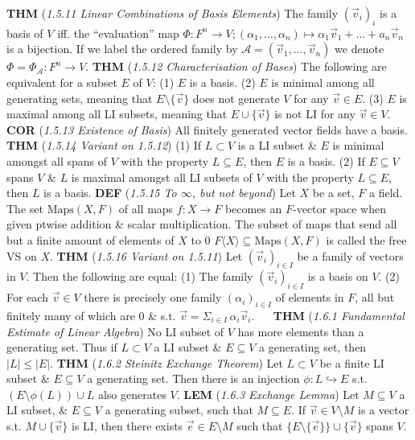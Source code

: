 \documentclass{article}
\newcommand{\wde}[1]{\textcolor{defc}{\textbf{DEF}} (\textcolor{namec}{\textit{#1}})}
\newcommand{\wl}[1]{\textcolor{lemc}{\textbf{LEM}} (\textcolor{namec}{\textit{#1}})}
\newcommand{\wc}[1]{\textcolor{corc}{\textbf{COR}} (\textcolor{namec}{\textit{#1}})}
\newcommand{\wt}[1]{\textcolor{thmc}{\textbf{THM}} (\textcolor{namec}{\textit{#1}})}
\newcommand{\Maps}[0]{\text{Maps}}
\begin{document}
\begin{multicols}{2}
  \wt{1.5.11 Linear Combinations of Basis Elements} The family $(\vec{v}_{i})_{i}$ is a basis of $V$ iff. the ``evaluation'' map $\Phi : F^{n} \to V; (\alpha_{1}, \dots, \alpha_{n}) \mapsto \alpha_{1}\vec{v}_{1} + \dots + a_{n}\vec{v}_{n}$ is a bijection. If we label the ordered family by $\mathcal{A} = (\vec{v}_{1}, \dots, \vec{v}_{n})$ we denote $\Phi = \Phi_{\mathcal{A}} : F^{n} \to V$.
  \wt{1.5.12 Characterisation of Bases} The following are equivalent for a subset $E$ of $V$:
  (1) $E$ is a basis.
  (2) $E$ is minimal among all generating sets, meaning that $E \setminus \{\vec{v}\}$ does not generate $V$ for any $\vec{v} \in E$.
  (3) $E$ is maximal among all LI subsets, meaning that $E \cup \{\vec{v}\}$ is not LI for any $\vec{v} \in V$.
  \wc{1.5.13 Existence of Basis} All finitely generated vector fields have a basis.
  \wt{1.5.14 Variant on 1.5.12}
  (1) If $L \subset V$ is a LI subset \& $E$ is minimal amongst all spans of $V$ with the property $L \subseteq E$, then $E$ is a basis.
  (2) If $E \subseteq V$ spans $V$ \& $L$ is maximal amongst all LI subsets of $V$ with the property $L \subseteq E$, then $L$ is a basis.
  \wde{1.5.15 To $\infty$, but not beyond} Let $X$ be a set, $F$ a field. The set $\Maps(X,F)$ of all maps $f : X \to F$ becomes an $F$-vector space when given ptwise addition \& scalar multiplication. The subset of maps that send all but a finite amount of elements of $X$ to 0 $F \langle X \rangle \subseteq \Maps(X, F)$ is called the free VS on $X$.
  \wt{1.5.16 Variant on 1.5.11} Let $(\vec{v}_{i})_{i \in I}$ be a family of vectors in $V$. Then the following are equal:
  (1) The family $(\vec{v}_{i})_{i \in I}$ is a basis on $V$.
  (2) For each $\vec{v} \in V$ there is precisely one family $(\alpha_{i})_{i \in I}$ of elements in $F$, all but finitely many of which are 0 \& s.t. $\vec{v} = \Sigma_{i \in I} \, \alpha_{i}\vec{v}_{i}$.
\ \
  \wt{1.6.1 Fundamental Estimate of Linear Algebra} No LI subset of $V$ has more elements than a generating set. Thus if $L \subset V$ a LI subset \& $E \subseteq V$ a generating set, then $|L| \le |E|$.
  \wt{1.6.2 Steinitz Exchange Theorem} Let $L \subset V$ be a finite LI subset \& $E \subseteq V$ a generating set. Then there is an injection $\phi : L \hookrightarrow E$ s.t. $(E \setminus \phi(L)) \cup L$ also generates $V$.
  \wl{1.6.3 Exchange Lemma} Let $M \subseteq V$ a LI subset, \& $E \subseteq V$ a generating subset, such that $M \subseteq E$. If $\vec{v} \in V \setminus M$ is a vector s.t. $M \cup \{\vec{v}\}$ is LI, then there exists $\vec{e} \in E \setminus M$ such that $\{E \setminus \{\vec{e}\}\} \cup \{\vec{v}\}$ spans $V$.

\end{multicols}
\end{document}
